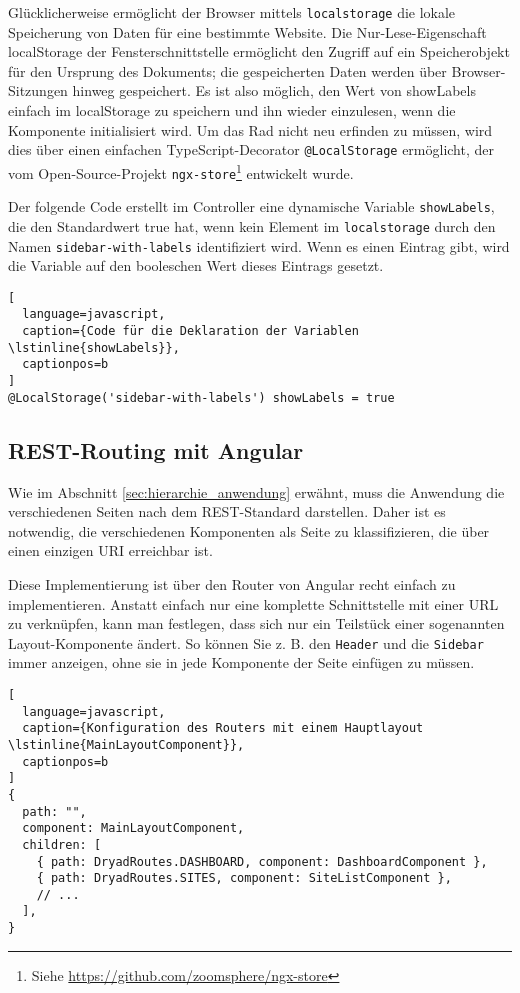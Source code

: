 Glücklicherweise ermöglicht der Browser mittels \lstinline{localstorage} die lokale Speicherung von Daten für eine bestimmte Website\cite{localstorage}.
Die Nur-Lese-Eigenschaft localStorage der Fensterschnittstelle ermöglicht den Zugriff auf ein Speicherobjekt für den Ursprung des Dokuments; die gespeicherten Daten werden über Browser-Sitzungen hinweg gespeichert.
Es ist also möglich, den Wert von showLabels einfach im localStorage zu speichern und ihn wieder einzulesen, wenn die Komponente initialisiert wird.
Um das Rad nicht neu erfinden zu müssen, wird dies über einen einfachen TypeScript-Decorator \lstinline{@LocalStorage} ermöglicht, der vom Open-Source-Projekt \lstinline{ngx-store}\footnote{Siehe \href{https://github.com/zoomsphere/ngx-store}{https://github.com/zoomsphere/ngx-store}} entwickelt wurde.

Der folgende Code erstellt im Controller eine dynamische Variable \lstinline{showLabels}, die den Standardwert true hat, wenn kein Element im \lstinline{localstorage} durch den Namen \lstinline{sidebar-with-labels} identifiziert wird.
Wenn es einen Eintrag gibt, wird die Variable auf den booleschen Wert dieses Eintrags gesetzt.

\begin{lstlisting}[
  language=javascript,
  caption={Code für die Deklaration der Variablen \lstinline{showLabels}},
  captionpos=b
]
@LocalStorage('sidebar-with-labels') showLabels = true
\end{lstlisting}

\subsection{REST-Routing mit Angular}

Wie im Abschnitt \ref{sec:hierarchie_anwendung} erwähnt, muss die Anwendung die verschiedenen Seiten nach dem \ac{REST}-Standard darstellen.
Daher ist es notwendig, die verschiedenen Komponenten als Seite zu klassifizieren, die über einen einzigen \ac{URI} erreichbar ist.

Diese Implementierung ist über den Router von Angular recht einfach zu implementieren.
Anstatt einfach nur eine komplette Schnittstelle mit einer URL zu verknüpfen, kann man festlegen, dass sich nur ein Teilstück einer sogenannten Layout-Komponente ändert.
So können Sie z. B. den \lstinline{Header} und die \lstinline{Sidebar} immer anzeigen, ohne sie in jede Komponente der Seite einfügen zu müssen.

\begin{lstlisting}[
  language=javascript,
  caption={Konfiguration des Routers mit einem Hauptlayout \lstinline{MainLayoutComponent}},
  captionpos=b
]
{
  path: "",
  component: MainLayoutComponent,
  children: [
    { path: DryadRoutes.DASHBOARD, component: DashboardComponent },
    { path: DryadRoutes.SITES, component: SiteListComponent },
    // ...
  ],
}
\end{lstlisting}

